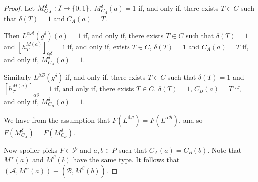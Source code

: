 \documentclass[../main/thesis.tex]{subfiles}
\begin{document}
\begin{proof}
  Let $M^{\delta}_{C_A} : I \rightarrow \{0,1\}$, $M^{\delta}_{C_A}(a) = 1$ if, and only
  if, there exists $T \in C$ such that $\delta(T) = 1$ and $C_A(a) = T$.

  Then $L^{\alpha \mathcal{A}}(g^{\delta})(a) = 1$ if, and only if, there exists
  $T \in C$ such that $\delta (T) = 1$ and $[h^{M(a)}_T]_{\alpha \delta} = 1$
  if, and only if, exists $T \in C$, $\delta(T) = 1$ and $C_A(a) = T$ if, and
  only if, $M^\delta_{C_A}(a) = 1$.

  Similarly $L^{\beta \mathcal{B}}(g^{\delta})$ if, and only if, there exists $T
  \in C$ such that $\delta (T) = 1$ and $[h^{M(a)}_T]_{\alpha \delta} = 1$ if,
  and only if, there exists $T \in C$, $\delta(T) = 1$, $C_B(a) = T$ if, and
  only if, $M^{\delta}_{C_B}(a) = 1$.

  We have from the assumption that $F(L^{\beta \mathcal{A}}) = F(L^{\alpha
    \mathcal{B}})$, and so $F(M^\delta_{C_A}) = F(M^{\delta}_{C_B})$.


  Now spoiler picks $P \in \mathcal{P}$ and $a, b \in P$ such that $C_A(a) =
  C_B(b)$. Note that $M^\alpha(a)$ and $M^\beta(b)$ have the same type. It
  follows that $(\mathcal{A}, M^{\alpha}(a)) \equiv (\mathcal{B}, M^{\beta}(b))$.




\end{proof}
\end{document}
